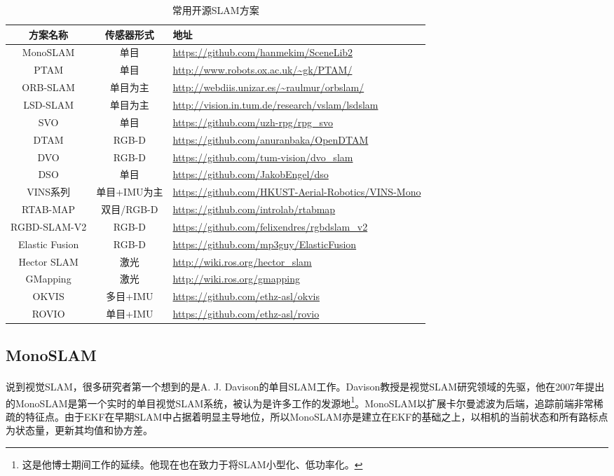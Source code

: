 {
\small
\begin{table}[!h]
\caption{常用开源SLAM方案}
\label{table:opensource-slam}
\begin{tabu}{@{}c|c|X@{}}
\toprule
	方案名称 & 传感器形式 & 地址 \\
\midrule
	MonoSLAM &  单目 & \url{https://github.com/hanmekim/SceneLib2}  \\ 
	PTAM & 单目 & \url{http://www.robots.ox.ac.uk/~gk/PTAM/} \\ 
	ORB-SLAM & 单目为主 & \url{http://webdiis.unizar.es/~raulmur/orbslam/} \\ 
	LSD-SLAM & 单目为主 & \url{http://vision.in.tum.de/research/vslam/lsdslam} \smallskip \\
	SVO & 单目 & \url{https://github.com/uzh-rpg/rpg_svo} \\ 
	DTAM & RGB-D & \url{https://github.com/anuranbaka/OpenDTAM} \\ 
	DVO & RGB-D & \url{https://github.com/tum-vision/dvo_slam} \\ 
	DSO & 单目 & \url{https://github.com/JakobEngel/dso} \\
    VINS系列 & 单目+IMU为主 & \url{https://github.com/HKUST-Aerial-Robotics/VINS-Mono} \\
	RTAB-MAP & 双目/RGB-D & \url{https://github.com/introlab/rtabmap} \\ 
	RGBD-SLAM-V2 & RGB-D & \url{https://github.com/felixendres/rgbdslam_v2} \\ 
	Elastic Fusion & RGB-D & \url{https://github.com/mp3guy/ElasticFusion} \\ 
	Hector SLAM & 激光 & \url{http://wiki.ros.org/hector_slam} \\ 
	GMapping & 激光 & \url{http://wiki.ros.org/gmapping} \\ 
	OKVIS & 多目+IMU & \url{https://github.com/ethz-asl/okvis} \\ 
	ROVIO & 单目+IMU & \url{https://github.com/ethz-asl/rovio} \\ 
\bottomrule
\end{tabu}
\end{table}
}

\smallskip
\subsection{MonoSLAM}
说到视觉SLAM，很多研究者第一个想到的是A. J. Davison的单目SLAM工作\textsuperscript{\cite{Davison2007,Davison2003}}。Davison教授是视觉SLAM研究领域的先驱，他在2007年提出的MonoSLAM是第一个实时的单目视觉SLAM系统\textsuperscript{\cite{Davison2007}}，被认为是许多工作的发源地\footnote{这是他博士期间工作的延续。他现在也在致力于将SLAM小型化、低功率化。}。MonoSLAM以扩展卡尔曼滤波为后端，追踪前端非常稀疏的特征点。由于EKF在早期SLAM中占据着明显主导地位，所以MonoSLAM亦是建立在EKF的基础之上，以相机的当前状态和所有路标点为状态量，更新其均值和协方差。

